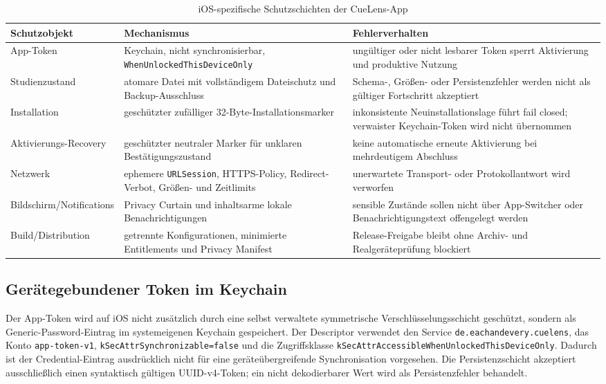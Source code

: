 \begin{neu}
\begin{table}[htbp]
\centering
\caption{iOS-spezifische Schutzschichten der CueLens-App}
\label{tab:ios-security-layers}
\begin{tabular}{p{}p{}p{}}
\textbf{Schutzobjekt} & \textbf{Mechanismus} & \textbf{Fehlerverhalten} \\
\hline
App-Token & Keychain, nicht synchronisierbar, \texttt{WhenUnlockedThisDeviceOnly} & ungültiger oder nicht lesbarer Token sperrt Aktivierung und produktive Nutzung \\
Studienzustand & atomare Datei mit vollständigem Dateischutz und Backup-Ausschluss & Schema-, Größen- oder Persistenzfehler werden nicht als gültiger Fortschritt akzeptiert \\
Installation & geschützter zufälliger 32-Byte-Installationsmarker & inkonsistente Neuinstallationslage führt fail closed; verwaister Keychain-Token wird nicht übernommen \\
Aktivierungs-Recovery & geschützter neutraler Marker für unklaren Bestätigungszustand & keine automatische erneute Aktivierung bei mehrdeutigem Abschluss \\
Netzwerk & ephemere \texttt{URLSession}, HTTPS-Policy, Redirect-Verbot, Größen- und Zeitlimits & unerwartete Transport- oder Protokollantwort wird verworfen \\
Bildschirm/Notifications & Privacy Curtain und inhaltsarme lokale Benachrichtigungen & sensible Zustände sollen nicht über App-Switcher oder Benachrichtigungstext offengelegt werden \\
Build/Distribution & getrennte Konfigurationen, minimierte Entitlements und Privacy Manifest & Release-Freigabe bleibt ohne Archiv- und Realgeräteprüfung blockiert \\
\end{tabular}
\end{table}

\subsection{Gerätegebundener Token im Keychain}

Der App-Token wird auf iOS nicht zusätzlich durch eine selbst verwaltete symmetrische Verschlüsselungsschicht geschützt, sondern als Generic-Password-Eintrag im systemeigenen Keychain gespeichert. Der Descriptor verwendet den Service \texttt{de.eachandevery.cuelens}, das Konto \texttt{app-token-v1}, \texttt{kSecAttrSynchronizable=false} und die Zugriffsklasse \texttt{kSecAttrAccessibleWhenUnlockedThisDeviceOnly}. Dadurch ist der Credential-Eintrag ausdrücklich nicht für eine geräteübergreifende Synchronisation vorgesehen. Die Persistenzschicht akzeptiert ausschließlich einen syntaktisch gültigen UUID-v4-Token; ein nicht dekodierbarer Wert wird als Persistenzfehler behandelt.


\end{neu}
